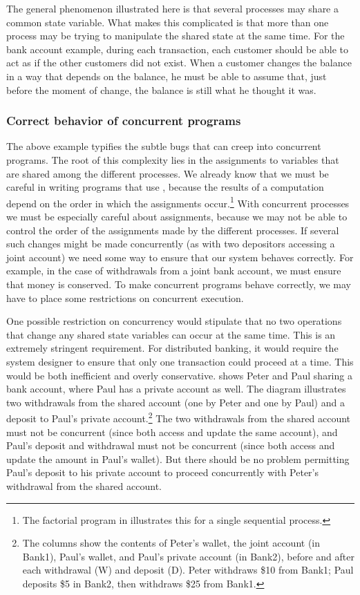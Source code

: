 The general phenomenon illustrated here is that several processes may share a
common state variable.  What makes this complicated is that more than one
process may be trying to manipulate the shared state at the same time.  For the
bank account example, during each transaction, each customer should be able to
act as if the other customers did not exist.  When a customer changes the
balance in a way that depends on the balance, he must be able to assume that,
just before the moment of change, the balance is still what he thought it was.

\subsubsection*{Correct behavior of concurrent programs}

The above example typifies the subtle bugs that can creep into concurrent
programs.  The root of this complexity lies in the assignments to variables
that are shared among the different processes.  We already know that we must be
careful in writing programs that use , because the results of a
computation depend on the order in which the assignments occur.\footnote{The
factorial program in  illustrates this for a single
sequential process.}  With concurrent processes we must be especially careful
about assignments, because we may not be able to control the order of the
assignments made by the different processes.  If several such changes might be
made concurrently (as with two depositors accessing a joint account) we need
some way to ensure that our system behaves correctly.  For example, in the case
of withdrawals from a joint bank account, we must ensure that money is
conserved.  To make concurrent programs behave correctly, we may have to place
some restrictions on concurrent execution.

One possible restriction on concurrency would stipulate that no two operations
that change any shared state variables can occur at the same time.  This is an
extremely stringent requirement.  For distributed banking, it would require the
system designer to ensure that only one transaction could proceed at a time.
This would be both inefficient and overly conservative.  
shows Peter and Paul sharing a bank account, where Paul has a private account
as well.  The diagram illustrates two withdrawals from the shared account (one
by Peter and one by Paul) and a deposit to Paul's private account.\footnote{The
columns show the contents of Peter's wallet, the joint account (in Bank1),
Paul's wallet, and Paul's private account (in Bank2), before and after each
withdrawal (W) and deposit (D).  Peter withdraws \$10 from Bank1; Paul deposits
\$5 in Bank2, then withdraws \$25 from Bank1.}  The two withdrawals from the
shared account must not be concurrent (since both access and update the same
account), and Paul's deposit and withdrawal must not be concurrent (since both
access and update the amount in Paul's wallet).  But there should be no problem
permitting Paul's deposit to his private account to proceed concurrently with
Peter's withdrawal from the shared account.

